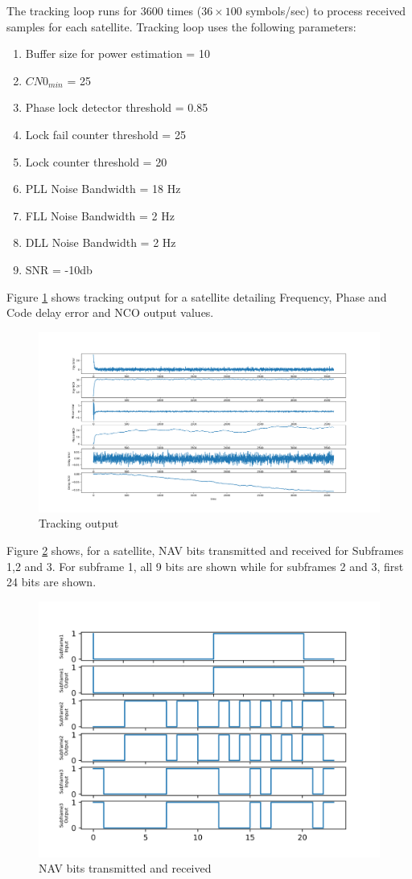 \documentclass[conference]{IEEEtran}
\begin{document}
The tracking loop runs for 3600 times ($36\times100$ symbols/sec) to process received samples for 
each satellite. Tracking loop uses the following parameters:
\begin{enumerate}
	\item Buffer size for power estimation = 10
	\item  $CN0_{min}$ = 25
	\item Phase lock detector threshold = 0.85
	\item Lock fail counter threshold = 25 
	\item Lock counter threshold = 20
	\item PLL Noise Bandwidth = 18 Hz
	\item FLL Noise Bandwidth = 2 Hz
	\item DLL Noise Bandwidth = 2 Hz
	\item SNR = -10db
\end{enumerate}
Figure \ref{fig:tracking_output} shows tracking output for a satellite detailing Frequency, Phase and Code delay error and NCO output values.
\begin{figure}[ht]
	\centering
	\includegraphics[width=1\columnwidth]{figs/tracking_output.png}
	\centering
	\caption{Tracking output}
	\label{fig:tracking_output}
\end{figure}

Figure \ref{fig:navbits_output} shows, for a satellite, NAV bits transmitted and received for Subframes 1,2 and 3. 
For subframe 1, all 9 bits are shown while for subframes 2 and 3, first 24 bits are shown.

\begin{figure}[ht]
	\centering
	\includegraphics[width=0.75\columnwidth]{figs/mynavbits.png}
	\centering
	\caption{NAV bits transmitted and received}
	\label{fig:navbits_output}
\end{figure}
\end{document}
